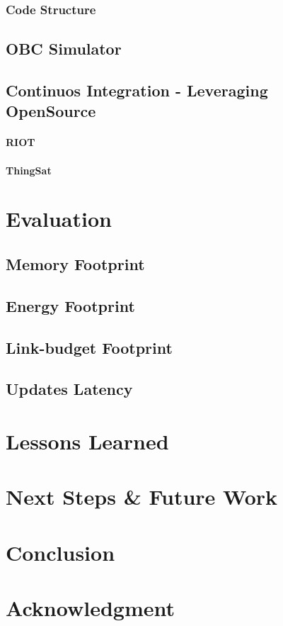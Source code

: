 \documentclass[conference]{IEEEtran}
\begin{document}
\subsubsection{Code Structure}

\subsection{OBC Simulator}

\subsection{Continuos Integration - Leveraging OpenSource}
\paragraph*{RIOT}
\paragraph*{ThingSat}

\section{Evaluation}
\label{sec:evaluation}

\subsection{Memory Footprint}
\subsection{Energy Footprint}
\subsection{Link-budget Footprint}
\subsection{Updates Latency}

\section{Lessons Learned}

\section{Next Steps \& Future Work}
\label{sec:futurework}

\section{Conclusion}

\section*{Acknowledgment}



\end{document}

